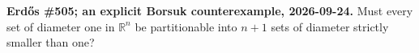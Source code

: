 \textbf{Erd\H{o}s \#505; an explicit Borsuk counterexample, 2026-09-24.}
Must every set of diameter one in $\mathbb R^n$ be partitionable into $n+1$ sets of diameter strictly smaller than one?
